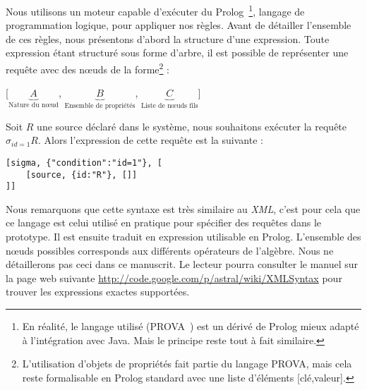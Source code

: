 Nous utilisons un moteur capable d'exécuter du Prolog~\footnote{En réalité, le langage utilisé (PROVA~\cite{Kozlenkov:prova}) est un dérivé de Prolog mieux adapté à l'intégration avec Java. Mais le principe reste tout à fait similaire.}, langage de programmation logique, pour appliquer nos règles. Avant de détailler l'ensemble de ces règles, nous présentons d'abord la structure d'une expression. Toute expression étant structuré sous forme d'arbre, il est possible de représenter une requête avec des nœuds de la forme\footnote{L'utilisation d'objets de propriétés fait partie du langage PROVA, mais cela reste formalisable en Prolog standard avec une liste d'éléments [clé,valeur].} :
\begin{center} [$\underbrace{A}_{\textrm{Nature du nœud}}$, $\underbrace{B}_{\textrm{Ensemble de propriétés}}$, $\underbrace{C}_{\textrm{Liste de nœuds fils}}$] \end{center}
\begin{example}
	Soit $R$ une source déclaré dans le système, nous souhaitons exécuter la requête $\sigma_{id=1} R$. Alors l'expression de cette requête est la suivante :
	\begin{lstlisting}
[sigma,	{"condition":"id=1"}, [
	[source, {id:"R"}, []]
]]
	\end{lstlisting}
\end{example}
Nous remarquons que cette syntaxe est très similaire au \textit{XML}, c'est pour cela que ce langage est celui utilisé en pratique pour spécifier des requêtes dans le prototype. Il est ensuite traduit en expression utilisable en Prolog. L'ensemble des nœuds possibles corresponds aux différents opérateurs de l'algèbre. Nous ne détaillerons pas ceci dans ce manuscrit. Le lecteur pourra consulter le manuel sur la page web suivante \url{http://code.google.com/p/astral/wiki/XMLSyntax} pour trouver les expressions exactes supportées.